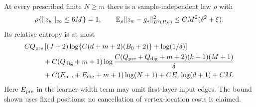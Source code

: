 \begin{lemma}
\label{lem:independent-raw-bit-comparison}
At every prescribed finite $N\ge m$ there is a sample-independent
law $\rho$ with
\[
 \rho\{\|z_w\|_\infty\le6M\}=1,\qquad
 \mathbb E_\rho\|z_w-g_*\|_{L^2(P_X)}^2\le CM^2(\delta^2+\xi).
\]
Its relative entropy is at most
\begin{align}
 C Q_{\rm pre}
 &\left[(J+2)\log\{C(d+m+2)(B_0+2)\}
                      +\log(1/\delta)\right]\notag\\
 &+C(Q_{\rm dig}+m+1)
      \log\frac{C(Q_{\rm pre}+Q_{\rm dig}+m+2)(k+1)(M+1)}{\delta}
 \notag\\
 &+C(E_{\rm pre}+E_{\rm dig}+m+1)\log(N+1)
       +C E_1\log(d+1)+CM.
 \label{eq:independent-raw-bit-KL}
\end{align}
Here $E_{\rm pre}$ in the learner-width term may omit first-layer
input edges. The bound shown uses fixed positions; no cancellation
of vertex-location costs is claimed.
\end{lemma}

